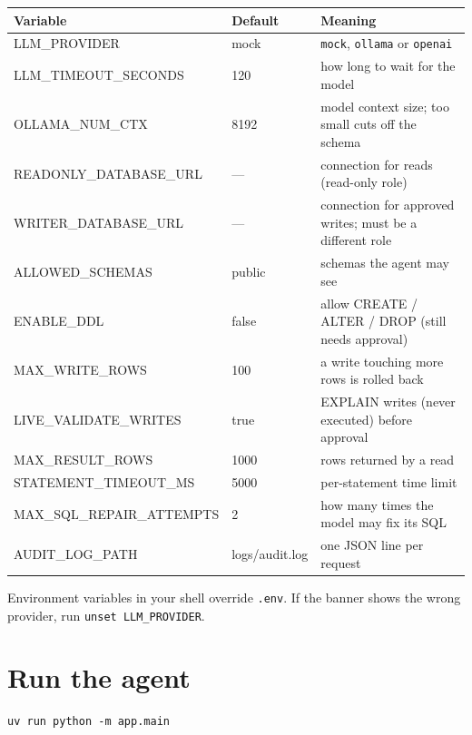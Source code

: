 \documentclass[11pt,a4paper]{article}
\newcommand{\note}[1]{%
  \par\smallskip\noindent\colorbox{warnbg}{\parbox{\dimexpr\linewidth-2\fboxsep}{\small #1}}\par\smallskip}
\begin{document}
\begin{center}
\begin{tabular}{@{}>{\ttfamily}l l p{7.3cm}@{}}
\toprule
\textrm{\textbf{Variable}} & \textbf{Default} & \textbf{Meaning} \\
\midrule
LLM\_PROVIDER            & mock   & \texttt{mock}, \texttt{ollama} or \texttt{openai} \\
LLM\_TIMEOUT\_SECONDS    & 120    & how long to wait for the model \\
OLLAMA\_NUM\_CTX         & 8192   & model context size; too small cuts off the schema \\
READONLY\_DATABASE\_URL  & ---    & connection for reads (read-only role) \\
WRITER\_DATABASE\_URL    & ---    & connection for approved writes; must be a different role \\
ALLOWED\_SCHEMAS         & public & schemas the agent may see \\
ENABLE\_DDL              & false  & allow CREATE / ALTER / DROP (still needs approval) \\
MAX\_WRITE\_ROWS         & 100    & a write touching more rows is rolled back \\
LIVE\_VALIDATE\_WRITES   & true   & EXPLAIN writes (never executed) before approval \\
MAX\_RESULT\_ROWS        & 1000   & rows returned by a read \\
STATEMENT\_TIMEOUT\_MS   & 5000   & per-statement time limit \\
MAX\_SQL\_REPAIR\_ATTEMPTS & 2    & how many times the model may fix its SQL \\
AUDIT\_LOG\_PATH         & logs/audit.log & one JSON line per request \\
\bottomrule
\end{tabular}
\end{center}

\note{Environment variables in your shell override \texttt{.env}. If the
banner shows the wrong provider, run \texttt{unset LLM\_PROVIDER}.}

\section{Run the agent}

\begin{lstlisting}
uv run python -m app.main
\end{lstlisting}
\end{document}
